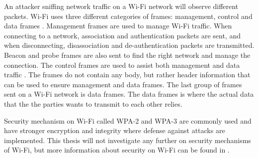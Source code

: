 An attacker sniffing network traffic on a \gls{Wi-Fi} network will observe different packets. \gls{Wi-Fi} uses three different categories of frames: management, control and data frames \cite{WiFiFrameMGMT}. Management frames are used to manage \gls{Wi-Fi} traffic. When connecting to a network, association and authentication packets are sent, and when disconnecting, disassociation and de-authentication packets are transmitted. Beacon and probe frames are also sent to find the right network and manage the connection. The control frames are used to assist both management and data traffic \cite{WiFiFrames}. The frames do not contain any body, but rather header information that can be used to ensure management and data frames. The last group of frames sent on a \gls{Wi-Fi} network is data frames. The data frames is where the actual data that the the parties wants to transmit to each other relies. 

Security mechanism on \gls{Wi-Fi} called \gls{WPA}-2 and \gls{WPA}-3 are commonly used and have stronger encryption and integrity where defense against attacks are implemented. This thesis will not investigate any further on security mechanisms of \gls{Wi-Fi}, but more information about security on \gls{Wi-Fi} can be found in \cite{WAP}. 